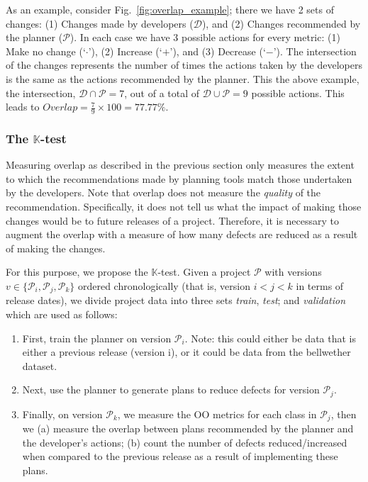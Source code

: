 \documentclass[10pt, journal, compsoc]{IEEEtran}
\newcommand{\be}{\begin{enumerate}}
\newcommand{\ee}{\end{enumerate}}
\newcommand{\ktest}{$\mathbb{K}$-test}
\newcommand{\fig}[1]{Fig.~\ref{fig:#1}}
\begin{document}
As an example, consider \fig{overlap_example}; there we have 2 sets of changes: (1) Changes made by developers ($\mathcal{D}$), and (2) Changes recommended by the planner ($\mathcal{P}$). In each case we have 3 possible actions for every metric: (1) Make no change (`$\cdot$'), (2) Increase (`$+$'), and (3) Decrease (`$-$'). The intersection of the changes represents the number of times the actions taken by the developers is the same as the actions recommended by the planner. This the above example, the intersection, $\mathcal{D}\cap\mathcal{P}=7$, out of a total of $\mathcal{D}\cup\mathcal{P}=9$ possible actions. This leads to $Overlap=\frac{7}{9}\times100=77.77\%$.





\subsubsection{The \ktest}

Measuring overlap as described in the previous section only measures the extent to which the recommendations made by planning tools match those undertaken by the developers. 
Note that overlap does not measure the \textit{quality} of the recommendation. Specifically, it does not tell us what the impact of making those changes would be to future releases of a project. Therefore, it is necessary to augment the overlap with a measure of how many defects are reduced as a result of making the changes. 


For this purpose, we propose the \ktest. Given a project $\mathcal{P}$ with versions $v\in\{\mathcal{P}_i, \mathcal{P}_j, \mathcal{P}_k\}$ ordered chronologically (that is, version $i<j<k$ in terms of release dates), we divide  project data into three sets \textit{train}, \textit{test}; and \textit{validation}
which are used as follows:
\be
\item First, train the planner on version $\mathcal{P}_i$. Note: this could either be data that is either a previous release (version i), or it could be data from the bellwether dataset. 
\item Next, use the planner to generate plans to reduce defects for version $\mathcal{P}_j$.
\item Finally, on version $\mathcal{P}_k$, we measure the OO metrics for each class in $\mathcal{P}_j$, then we (a) measure the overlap between plans recommended by the planner and the developer's actions; (b) count the number of defects reduced/increased when compared to the previous release as a result of implementing these plans.
\ee
\end{document}
